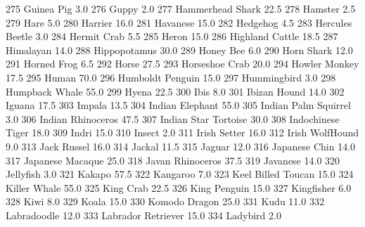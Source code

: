 \documentclass[a4paper]{article}
\begin{document}
\begin{Schunk}
\begin{Soutput}
275                     Guinea Pig      3.0
276                          Guppy      2.0
277               Hammerhead Shark     22.5
278                        Hamster      2.5
279                           Hare      5.0
280                        Harrier     16.0
281                       Havanese     15.0
282                       Hedgehog      4.5
283                Hercules Beetle      3.0
284                    Hermit Crab      5.5
285                          Heron     15.0
286                Highland Cattle     18.5
287                      Himalayan     14.0
288                   Hippopotamus     30.0
289                      Honey Bee      6.0
290                     Horn Shark     12.0
291                    Horned Frog      6.5
292                          Horse     27.5
293                 Horseshoe Crab     20.0
294                  Howler Monkey     17.5
295                          Human     70.0
296               Humboldt Penguin     15.0
297                    Hummingbird      3.0
298                 Humpback Whale     55.0
299                          Hyena     22.5
300                           Ibis      8.0
301                   Ibizan Hound     14.0
302                         Iguana     17.5
303                         Impala     13.5
304                Indian Elephant     55.0
305           Indian Palm Squirrel      3.0
306              Indian Rhinoceros     47.5
307           Indian Star Tortoise     30.0
308              Indochinese Tiger     18.0
309                          Indri     15.0
310                         Insect      2.0
311                   Irish Setter     16.0
312                Irish WolfHound      9.0
313                    Jack Russel     16.0
314                         Jackal     11.5
315                         Jaguar     12.0
316                  Japanese Chin     14.0
317               Japanese Macaque     25.0
318               Javan Rhinoceros     37.5
319                       Javanese     14.0
320                      Jellyfish      3.0
321                         Kakapo     57.5
322                       Kangaroo      7.0
323             Keel Billed Toucan     15.0
324                   Killer Whale     55.0
325                      King Crab     22.5
326                   King Penguin     15.0
327                     Kingfisher      6.0
328                           Kiwi      8.0
329                          Koala     15.0
330                  Komodo Dragon     25.0
331                           Kudu     11.0
332                    Labradoodle     12.0
333             Labrador Retriever     15.0
334                       Ladybird      2.0

\end{Soutput}
\end{Schunk}
\end{document}
